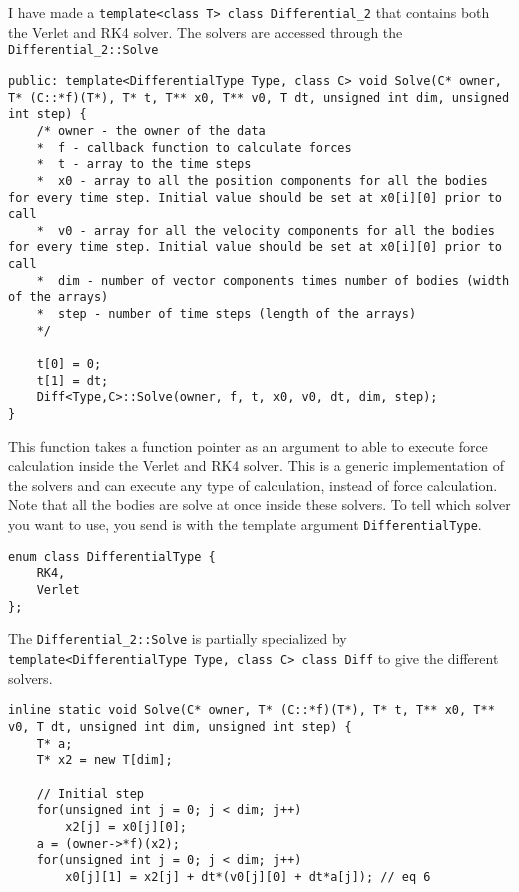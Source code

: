\documentclass[11pt,english,a4paper]{article}
\begin{document}
\begin{flushleft}
I have made a \texttt{template<class T> class Differential\_2} that contains both the Verlet  and RK4 solver. The solvers are accessed through the \texttt{Differential\_2::Solve}

\begin{lstlisting}[title={\texttt{Differential\_2::Solve}}]
public: template<DifferentialType Type, class C> void Solve(C* owner, T* (C::*f)(T*), T* t, T** x0, T** v0, T dt, unsigned int dim, unsigned int step) {
	/* owner - the owner of the data
	*  f - callback function to calculate forces
	*  t - array to the time steps
	*  x0 - array to all the position components for all the bodies for every time step. Initial value should be set at x0[i][0] prior to call
	*  v0 - array for all the velocity components for all the bodies for every time step. Initial value should be set at x0[i][0] prior to call
	*  dim - number of vector components times number of bodies (width of the arrays)
	*  step - number of time steps (length of the arrays)
	*/
	
	t[0] = 0;
	t[1] = dt;
	Diff<Type,C>::Solve(owner, f, t, x0, v0, dt, dim, step);
}
\end{lstlisting}

This function takes a function pointer as an argument to able to execute force calculation inside the Verlet and RK4 solver. This is a generic implementation of the solvers and can execute any type of calculation, instead of force calculation. Note that all the bodies are solve at once inside these solvers. To tell which solver you want to use, you send is with the template argument \texttt{DifferentialType}.

\begin{lstlisting}[title={\texttt{enum DifferentialType}}]
enum class DifferentialType {
	RK4,
	Verlet
};
\end{lstlisting}

The \texttt{Differential\_2::Solve} is partially specialized by \texttt{template<DifferentialType Type, class C> class Diff} to give the different solvers.

\begin{lstlisting}[title={\texttt{Differential\_2::Diff<DifferentialType::Verlet,C>::Solve}}]
inline static void Solve(C* owner, T* (C::*f)(T*), T* t, T** x0, T** v0, T dt, unsigned int dim, unsigned int step) {
	T* a;
	T* x2 = new T[dim];
	
	// Initial step
	for(unsigned int j = 0; j < dim; j++)
		x2[j] = x0[j][0];
	a = (owner->*f)(x2);
	for(unsigned int j = 0; j < dim; j++)
		x0[j][1] = x2[j] + dt*(v0[j][0] + dt*a[j]);	// eq 6
	

\end{lstlisting}
\end{flushleft}
\end{document}
